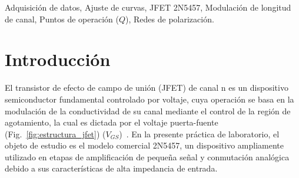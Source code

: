 \documentclass[conference]{IEEEtran}
\begin{document}
\begin{IEEEkeywords}
    Adquisición de datos, Ajuste de curvas, JFET 2N5457, Modulación de longitud de canal, Puntos de operación ($Q$), Redes de polarización.
\end{IEEEkeywords}
\section{Introducción}

El transistor de efecto de campo de unión (JFET) de canal n es un dispositivo
semiconductor fundamental controlado por voltaje, cuya operación se basa en la
modulación de la conductividad de su canal mediante el control de la región de
agotamiento, la cual es dictada por el voltaje puerta-fuente
(Fig.~\ref{fig:estructura_jfet}) ($V_{GS}$)~\cite{boylestad_dispositivos}. En
la presente práctica de laboratorio, el objeto de estudio es el modelo
comercial 2N5457, un dispositivo ampliamente utilizado en etapas de
amplificación de pequeña señal y conmutación analógica debido a sus
características de alta impedancia de entrada.
\end{document}
